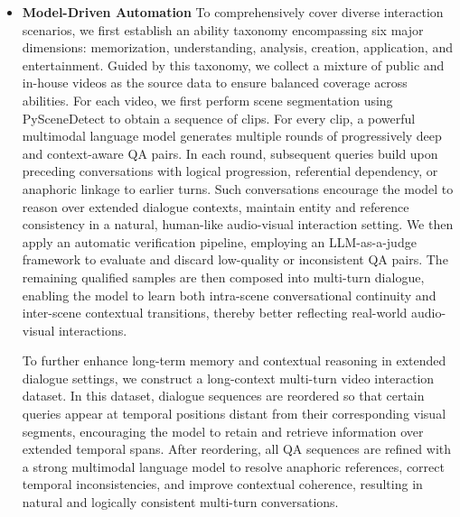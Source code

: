 \documentclass{article}
\begin{document}
\begin{itemize}
    \item \textbf{Model-Driven Automation} %
To comprehensively cover diverse interaction scenarios, we first establish an ability taxonomy encompassing six major dimensions: memorization, understanding, analysis, creation, application, and entertainment. Guided by this taxonomy, we collect a mixture of public and in-house videos as the source data to ensure balanced coverage across abilities. For each video, we first perform scene segmentation using PySceneDetect \citep{pyscenedetect} to obtain a sequence of clips. For every clip, a powerful multimodal language model generates multiple rounds of progressively deep and context-aware QA pairs. In each round, subsequent queries build upon preceding conversations with logical progression, referential dependency, or anaphoric linkage to earlier turns. Such conversations encourage the model to reason over extended dialogue contexts, maintain entity and reference consistency in a natural, human-like audio-visual interaction setting. We then apply an automatic verification pipeline, employing an LLM-as-a-judge framework to evaluate and discard low-quality or inconsistent QA pairs. The remaining qualified samples are then composed into multi-turn dialogue, enabling the model to learn both intra-scene conversational continuity and inter-scene contextual transitions, thereby better reflecting real-world audio-visual interactions.

To further enhance long-term memory and contextual reasoning in extended dialogue settings, we construct a long-context multi-turn video interaction dataset. In this dataset, dialogue sequences are reordered so that certain queries appear at temporal positions distant from their corresponding visual segments, encouraging the model to retain and retrieve information over extended temporal spans. After reordering, all QA sequences are refined with a strong multimodal language model to resolve anaphoric references, correct temporal inconsistencies, and improve contextual coherence, resulting in natural and logically consistent multi-turn conversations.


\end{itemize}
\end{document}
